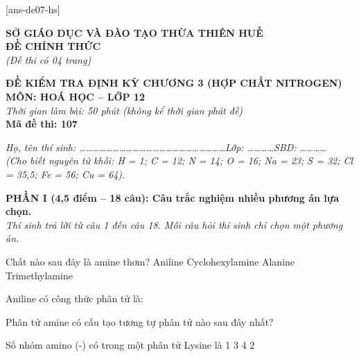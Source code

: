 \documentclass[11pt,a4paper]{article}
\def\loigiai#1{}
\begin{document}
[ans-de07-hs]

\noindent
\begin{minipage}[t]{0.48\textwidth}
	\centering
	\textbf{SỞ GIÁO DỤC VÀ ĐÀO TẠO THỪA THIÊN HUẾ}\\
	\textbf{ĐỀ CHÍNH THỨC}\\
	\textit{(Đề thi có 04 trang)}
\end{minipage}\hfill
\begin{minipage}[t]{0.48\textwidth}
	\centering
	\textbf{\color{mainGreen}ĐỀ KIỂM TRA ĐỊNH KỲ CHƯƠNG 3 (HỢP CHẤT NITROGEN)}\\
	\textbf{MÔN: HOÁ HỌC -- LỚP 12}\\
	\textit{Thời gian làm bài: 50 phút (không kể thời gian phát đề)}\\
	\textbf{Mã đề thi: 107}
\end{minipage}


\vspace{0.1cm}
\noindent\textit{Họ, tên thí sinh: \dots\dots\dots\dots\dots\dots\dots\dots\dots\dots\dots\dots\dots\dots\dots\dots\dots\dots\dots\dots\dots\dots Lớp: \dots\dots\dots\dots SBD: \dots\dots\dots\dots}\\
\noindent\textit{(Cho biết nguyên tử khối: H = 1; C = 12; N = 14; O = 16; Na = 23; S = 32; Cl = 35,5; Fe = 56; Cu = 64).}

\vspace{0.15cm}
\noindent
\textbf{PHẦN I (4,5 điểm -- 18 câu): Câu trắc nghiệm nhiều phương án lựa chọn.}\\
\textit{Thí sinh trả lời từ câu 1 đến câu 18. Mỗi câu hỏi thí sinh chỉ chọn một phương án.}

\setcounter{ex}{0}

\begin{ex}
Chất nào sau đây là amine thơm?
\choice
{Aniline}
{Cyclohexylamine}
{Alanine}
{Trimethylamine}
\loigiai{}
\end{ex}

\begin{ex}
Aniline có công thức phân tử là:
\choice
{}
{}
{}
{}
\loigiai{}
\end{ex}

\begin{ex}
Phân tử amine có cấu tạo tương tự phân tử nào sau đây nhất?
\choice
{}
{}
{}
{}
\loigiai{}
\end{ex}

\begin{ex}
Số nhóm amino (-) có trong một phân tử Lysine là
\choice
{1}
{3}
{4}
{2}
\loigiai{}
\end{ex}
\end{document}
